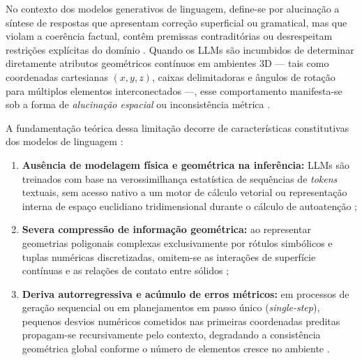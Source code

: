 No contexto dos modelos generativos de linguagem, define-se por alucinação a síntese de respostas que apresentam correção superficial ou gramatical, mas que violam a coerência factual, contêm premissas contraditórias ou desrespeitam restrições explícitas do domínio \cite{Gallotta_2024, xu2025constraint, bandeali2026generative}. Quando os LLMs são incumbidos de determinar diretamente atributos geométricos contínuos em ambientes 3D --- tais como coordenadas cartesianas $(x, y, z)$, caixas delimitadoras e ângulos de rotação para múltiplos elementos interconectados ---, esse comportamento manifesta-se sob a forma de \textit{alucinação espacial} ou inconsistência métrica \cite{Gallotta_2024, sun2024roomplanner, yang2026codeasroomgenerating3drooms, feng2026repurposing3dgenerativemodel}.

A fundamentação teórica dessa limitação decorre de características constitutivas dos modelos de linguagem \cite{Gallotta_2024, hu2024scenecraft, sun2024roomplanner, feng2026repurposing3dgenerativemodel}:
\begin{enumerate}
    \item \textbf{Ausência de modelagem física e geométrica na inferência:} LLMs são treinados com base na verossimilhança estatística de sequências de \textit{tokens} textuais, sem acesso nativo a um motor de cálculo vetorial ou representação interna de espaço euclidiano tridimensional durante o cálculo de autoatenção \cite{Gallotta_2024, sun2024roomplanner};
    \item \textbf{Severa compressão de informação geométrica:} ao representar geometrias poligonais complexas exclusivamente por rótulos simbólicos e tuplas numéricas discretizadas, omitem-se as interações de superfície contínuas e as relações de contato entre sólidos \cite{feng2026repurposing3dgenerativemodel};
    \item \textbf{Deriva autorregressiva e acúmulo de erros métricos:} em processos de geração sequencial ou em planejamentos em passo único (\textit{single-step}), pequenos desvios numéricos cometidos nas primeiras coordenadas preditas propagam-se recursivamente pelo contexto, degradando a consistência geométrica global conforme o número de elementos cresce no ambiente \cite{sun2024roomplanner, feng2026repurposing3dgenerativemodel, yang2026codeasroomgenerating3drooms}.
\end{enumerate}

